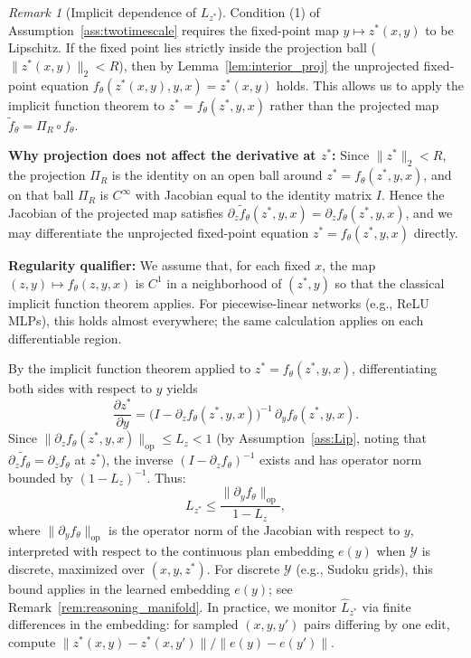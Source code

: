 \documentclass{article}
\theoremstyle{plain}
\theoremstyle{definition}
\theoremstyle{remark}
\newtheorem{remark}[theorem]{Remark}
\newcommand{\YY}{\mathcal{Y}}
\begin{document}
\begin{remark}[Implicit dependence of $L_{z^*}$]
\label{rem:Lzstar_implicit}
Condition (1) of Assumption~\ref{ass:twotimescale} requires the fixed-point map $y \mapsto z^*(x,y)$ to be Lipschitz.
If the fixed point lies strictly inside the projection ball ($\|z^*(x,y)\|_2 < R$), then by Lemma~\ref{lem:interior_proj} the unprojected fixed-point equation $f_\theta(z^*(x,y),y,x)=z^*(x,y)$ holds.
This allows us to apply the implicit function theorem to $z^* = f_\theta(z^*,y,x)$ rather than the projected map $\tilde f_\theta=\Pi_R\circ f_\theta$.

\textbf{Why projection does not affect the derivative at $z^*$:}
Since $\|z^*\|_2<R$, the projection $\Pi_R$ is the identity on an open ball around $z^*=f_\theta(z^*,y,x)$, and on that ball $\Pi_R$ is $C^\infty$ with Jacobian equal to the identity matrix $I$.
Hence the Jacobian of the projected map satisfies $\partial_z\tilde f_\theta(z^*,y,x)=\partial_z f_\theta(z^*,y,x)$, and we may differentiate the unprojected fixed-point equation $z^*=f_\theta(z^*,y,x)$ directly.

\textbf{Regularity qualifier:} We assume that, for each fixed $x$, the map $(z,y)\mapsto f_\theta(z,y,x)$ is $C^1$ in a neighborhood of $(z^*,y)$ so that the classical implicit function theorem applies.
For piecewise-linear networks (e.g., ReLU MLPs), this holds almost everywhere; the same calculation applies on each differentiable region.

By the implicit function theorem applied to $z^* = f_\theta(z^*, y, x)$, differentiating both sides with respect to $y$ yields
\begin{equation*}
\frac{\partial z^*}{\partial y} = \bigl(I - \partial_z f_\theta(z^*,y,x)\bigr)^{-1}
\,\partial_y f_\theta(z^*,y,x).
\end{equation*}
Since $\|\partial_z f_\theta(z^*,y,x)\|_{\mathrm{op}} \le L_z < 1$ (by Assumption~\ref{ass:Lip}, noting that $\partial_z\tilde f_\theta=\partial_z f_\theta$ at $z^*$), the inverse $(I-\partial_z f_\theta)^{-1}$ exists and has operator norm bounded by $(1-L_z)^{-1}$.
Thus:
\begin{equation}
L_{z^*} \le \frac{\|\partial_y f_\theta\|_{\mathrm{op}}}{1 - L_z},
\label{eq:Lzstar_bound}
\end{equation}
where $\|\partial_y f_\theta\|_{\mathrm{op}}$ is the operator norm of the Jacobian with respect to $y$, interpreted with respect to the continuous plan embedding $e(y)$ when $\YY$ is discrete, maximized over $(x,y,z^*)$.
For discrete $\YY$ (e.g., Sudoku grids), this bound applies in the learned embedding $e(y)$; see Remark~\ref{rem:reasoning_manifold}.
In practice, we monitor $\widehat{L}_{z^*}$ via finite differences in the embedding: for sampled $(x,y,y')$ pairs differing by one edit, compute $\|z^*(x,y) - z^*(x,y')\| / \|e(y) - e(y')\|$.
\end{remark}
\end{document}

